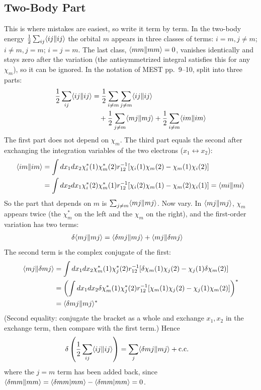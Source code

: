 \subsection{Two-Body Part}

This is where mistakes are easiest, so write it term by term. In the two-body energy $\frac{1}{2} \sum_{ij} \langle ij\Vert ij\rangle$ the orbital $m$ appears in three classes of terms: $i = m, j \neq m$; $i \neq m, j = m$; $i = j = m$. The last class, $\langle mm\Vert mm\rangle = 0$, vanishes identically and stays zero after the variation (the antisymmetrized integral satisfies this for any $\chi_m$), so it can be ignored. In the notation of MEST pp.~9--10, split into three parts:
\begin{align*}
\frac{1}{2} \sum_{ij} \langle ij\Vert ij\rangle &= \frac{1}{2} \sum_{i \neq m} \sum_{j \neq m} \langle ij\Vert ij\rangle \\
&\quad + \frac{1}{2} \sum_{j \neq m} \langle mj\Vert mj\rangle + \frac{1}{2} \sum_{i \neq m} \langle im\Vert im\rangle
\end{align*}
The first part does not depend on $\chi_m$. The third part equals the second after exchanging the integration variables of the two electrons ($x_1 \leftrightarrow x_2$):
\begin{align*}
\langle im\Vert im\rangle &= \int dx_1 dx_2 \chi_i^*(1) \chi_m^*(2) r_{12}^{-1} [\chi_i(1) \chi_m(2) - \chi_m(1) \chi_i(2)] \\
& = \int dx_2 dx_1 \chi_i^*(2) \chi_m^*(1) r_{12}^{-1} [\chi_i(2) \chi_m(1) - \chi_m(2) \chi_i(1)] = \langle mi\Vert mi\rangle
\end{align*}
So the part that depends on $m$ is $\sum_{j \neq m} \langle mj\Vert mj\rangle$. Now vary. In $\langle mj\Vert mj\rangle$, $\chi_m$ appears twice (the $\chi_m^*$ on the left and the $\chi_m$ on the right), and the first-order variation has two terms:
\begin{align*}
\delta \langle mj\Vert mj\rangle &= \langle \delta m j\Vert m j\rangle + \langle m j\Vert \delta m j\rangle
\end{align*}
The second term is the complex conjugate of the first:
\begin{align*}
\langle m j\Vert \delta m j\rangle &= \int dx_1 dx_2 \chi_m^*(1) \chi_j^*(2) r_{12}^{-1} [\delta \chi_m(1) \chi_j(2) - \chi_j(1) \delta \chi_m(2)] \\
&= \left( \int dx_1 dx_2 \delta \chi_m^*(1) \chi_j^*(2) r_{12}^{-1} [\chi_m(1) \chi_j(2) - \chi_j(1) \chi_m(2)] \right)^* \\
&= \langle \delta m j\Vert m j\rangle^*
\end{align*}
(Second equality: conjugate the bracket as a whole and exchange $x_1, x_2$ in the exchange term, then compare with the first term.) Hence
\begin{align*}
\delta \left( \frac{1}{2} \sum_{ij} \langle ij\Vert ij\rangle \right) &= \sum_j \langle \delta m j\Vert m j\rangle + \text{c.c.}
\end{align*}
where the $j = m$ term has been added back, since $\langle \delta m m\Vert m m\rangle = \langle \delta m m\vert m m\rangle - \langle \delta m m\vert m m\rangle = 0$.

